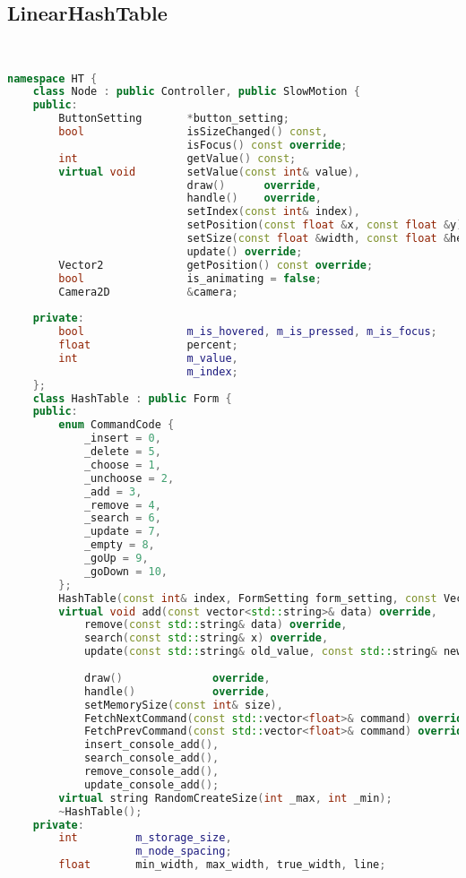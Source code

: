 \subsection{LinearHashTable}
\begin{lstlisting}[language=C++]


namespace HT {
    class Node : public Controller, public SlowMotion {
    public:
        ButtonSetting       *button_setting;
        bool                isSizeChanged() const,
                            isFocus() const override;
        int                 getValue() const;
        virtual void        setValue(const int& value),
                            draw()      override,
                            handle()    override,
                            setIndex(const int& index),
                            setPosition(const float &x, const float &y) override,
                            setSize(const float &width, const float &height) override,
                            update() override;
        Vector2             getPosition() const override;
        bool                is_animating = false;
        Camera2D            &camera;
        
    private:
        bool                m_is_hovered, m_is_pressed, m_is_focus;
        float               percent;
        int                 m_value,
                            m_index;
    };
    class HashTable : public Form {
    public:
        enum CommandCode {
            _insert = 0,
            _delete = 5,
            _choose = 1,
            _unchoose = 2,
            _add = 3,
            _remove = 4,
            _search = 6,
            _update = 7,
            _empty = 8,
            _goUp = 9,
            _goDown = 10,
        };
        HashTable(const int& index, FormSetting form_setting, const Vector2& window_size);
        virtual void add(const vector<std::string>& data) override,
            remove(const std::string& data) override,
            search(const std::string& x) override,
            update(const std::string& old_value, const std::string& new_value) override,
                
            draw()              override,
            handle()            override,
            setMemorySize(const int& size),
            FetchNextCommand(const std::vector<float>& command) override,
            FetchPrevCommand(const std::vector<float>& command) override,
            insert_console_add(),
            search_console_add(),
            remove_console_add(),
            update_console_add();
        virtual string RandomCreateSize(int _max, int _min);
        ~HashTable();
    private:
        int         m_storage_size,
                    m_node_spacing;
        float       min_width, max_width, true_width, line;


\end{lstlisting}
